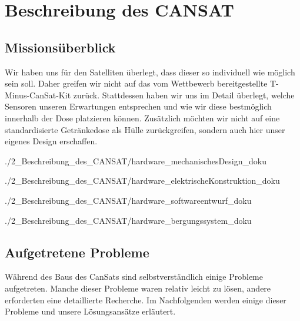\section{Beschreibung des CANSAT}


\subsection{Missionsüberblick}
Wir haben uns für den Satelliten überlegt, dass dieser so individuell wie möglich sein soll. Daher greifen wir nicht auf das vom Wettbewerb bereitgestellte T-Minus-CanSat-Kit zurück. Stattdessen haben wir uns im Detail überlegt, welche Sensoren unseren Erwartungen entsprechen und wie wir diese bestmöglich innerhalb der Dose platzieren können. Zusätzlich möchten wir nicht auf eine standardisierte Getränkedose als Hülle zurückgreifen, sondern auch hier unser eigenes Design erschaffen.

 {./2_Beschreibung_des_CANSAT/hardware_mechanischesDesign_doku}

 {./2_Beschreibung_des_CANSAT/hardware_elektrischeKonstruktion_doku}

 {./2_Beschreibung_des_CANSAT/hardware_softwareentwurf_doku}

 {./2_Beschreibung_des_CANSAT/hardware_bergungssystem_doku}

\subsection{Aufgetretene Probleme}
Während des Baus des CanSats sind selbstverständlich einige Probleme aufgetreten. Manche dieser Probleme waren relativ leicht zu lösen, andere erforderten eine detaillierte Recherche. Im Nachfolgenden werden einige dieser Probleme und unsere Lösungsansätze erläutert.

